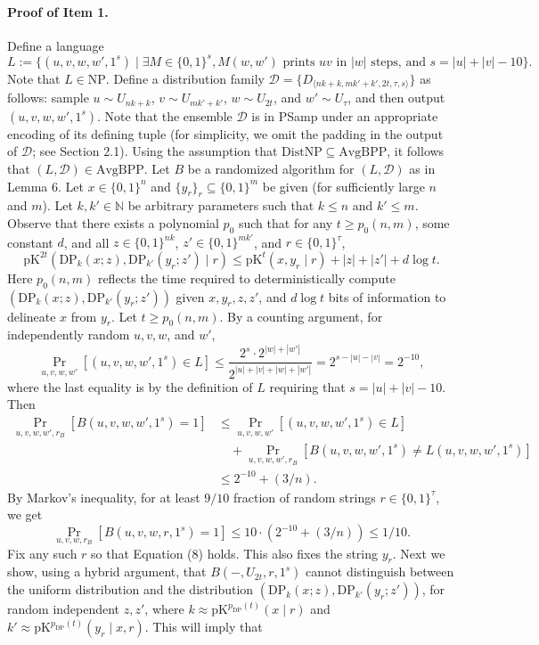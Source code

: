 \documentclass[10pt,a4paper]{article}
\begin{document}
\paragraph{Proof of Item 1.} Define a language
\[L:=\{(u,v,w,w',1^s)\mid\exists M\in\{0,1\}^s,M(w,w')\text{ prints }uv\text{ in }|w|\text{ steps, and }s=|u|+|v|-10\}.\]
Note that $L\in\mathrm{NP}$. Define a distribution family $\mathcal D=\{D_{\langle nk+k,mk'+k',2t,\tau,s\rangle}\}$ as follows: sample $u\sim U_{nk+k}$, $v\sim U_{mk'+k'}$, $w\sim U_{2t}$, and $w'\sim U_\tau$, and then output $(u,v,w,w',1^s)$. Note that the ensemble $\mathcal D$ is in PSamp under an appropriate encoding of its defining tuple (for simplicity, we omit the padding in the output of $\mathcal D$; see Section 2.1). Using the assumption that $\mathrm{DistNP}\subseteq\mathrm{AvgBPP}$, it follows that $(L,\mathcal D)\in\mathrm{AvgBPP}$. Let $B$ be a randomized algorithm for $(L,\mathcal D)$ as in Lemma 6.
Let $x\in\{0,1\}^n$ and $\{y_r\}_{r}\subseteq\{0,1\}^m$ be given (for sufficiently large $n$ and $m$). Let $k,k'\in\mathbb N$ be arbitrary parameters such that $k\leq n$ and $k'\leq m$. Observe that there exists a polynomial $p_0$ such that for any $t\geq p_0(n,m)$, some constant $d$, and all $z\in\{0,1\}^{nk}$, $z'\in\{0,1\}^{mk'}$, and $r\in\{0,1\}^\tau$,
\[\mathrm{pK}^{2t}(\mathrm{DP}_k(x;z),\mathrm{DP}_{k'}(y_r;z')\mid r)\leq\mathrm{pK}^t(x,y_r\mid r)+|z|+|z'|+d\log t.\tag{6}\]
Here $p_0(n,m)$ reflects the time required to deterministically compute $(\mathrm{DP}_k(x;z),\mathrm{DP}_{k'}(y_r;z'))$ given $x,y_r,z,z'$, and $d\log t$ bits of information to delineate $x$ from $y_r$.
Let $t\geq p_0(n,m)$. By a counting argument, for independently random $u,v,w$, and $w'$,
\[\Pr_{u,v,w,w'}[(u,v,w,w',1^s)\in L]\leq\frac{2^s\cdot2^{|w|+|w'|}}{2^{|u|+|v|+|w|+|w'|}}=2^{s-|u|-|v|}=2^{-10},\]
where the last equality is by the definition of $L$ requiring that $s=|u|+|v|-10$. Then
\begin{align*}
\Pr_{u,v,w,w',r_B}[B(u,v,w,w',1^s)=1]
&\leq\Pr_{u,v,w,w'}[(u,v,w,w',1^s)\in L]\\
&\quad+\Pr_{u,v,w,w',r_B}[B(u,v,w,w',1^s)\neq L(u,v,w,w',1^s)]\\
&\leq2^{-10}+(3/n).\tag{7}
\end{align*}
By Markov's inequality, for at least $9/10$ fraction of random strings $r\in\{0,1\}^\tau$, we get
\[\Pr_{u,v,w,r_B}[B(u,v,w,r,1^s)=1]\leq10\cdot(2^{-10}+(3/n))\leq1/10.\tag{8}\]
Fix any such $r$ so that Equation (8) holds. This also fixes the string $y_r$.
Next we show, using a hybrid argument, that $B(-,U_{2t},r,1^s)$ cannot distinguish between the uniform distribution and the distribution $(\mathrm{DP}_k(x;z),\mathrm{DP}_{k'}(y_r;z'))$, for random independent $z,z'$, where $k\approx\mathrm{pK}^{p_{\mathrm{DP}}(t)}(x\mid r)$ and $k'\approx\mathrm{pK}^{p_{\mathrm{DP}}(t)}(y_r\mid x,r)$. This will imply that
\end{document}
